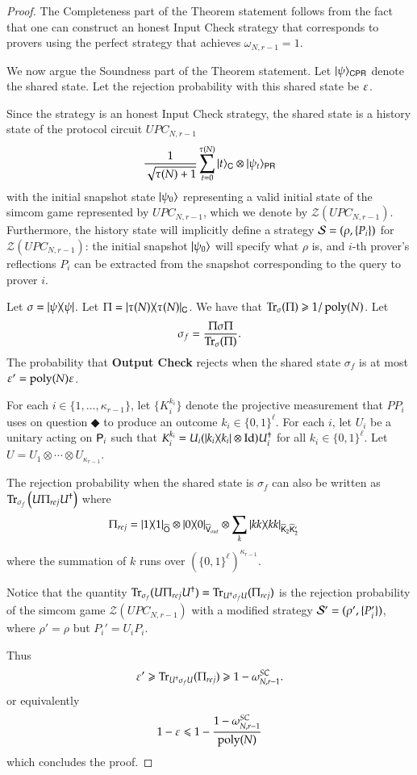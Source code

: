 \begin{proof}
The Completeness part of the Theorem statement follows from the fact that one can construct an honest Input Check strategy that corresponds to provers using the perfect strategy that achieves $\omega_{N,r-1} = 1$.

We now argue the Soundness part of the Theorem statement. Let $|\psi\rangle_{{\mathsf{C}} {\mathsf{P}} {\mathsf{R}}}$ denote the shared state. Let the rejection probability with this shared state be $\varepsilon$. 

Since the strategy is an honest Input Check strategy, the shared state is a history state of the protocol circuit $UPC_{N,r-1}$
\[
\frac{1}{\sqrt{\tau(N) + 1}} \sum_{t = 0}^{\tau(N)} |t\rangle_{{\mathsf{C}}} \otimes |\psi_t\rangle_{{\mathsf{P}} {\mathsf{R}}}
\]
with the initial snapshot state $|\psi_0\rangle$ representing a valid initial state of the simcom game represented by $UPC_{N,r-1}$, which we denote by $\mathscr{Z}(UPC_{N,r-1})$. Furthermore, the history state will implicitly define a strategy $\mathcal{S} = (\rho,\{P_i\})$ for $\mathscr{Z}(UPC_{N,r-1})$: the initial snapshot $|\psi_0\rangle$ will specify what $\rho$ is, and $i$-th prover's reflections $P_i$ can be extracted from the snapshot corresponding to the query to prover $i$.

Let $\sigma = |\psi\rangle\! \langle \psi|$. Let $\Pi = |\tau(N)\rangle\! \langle \tau(N)|_{{\mathsf{C}}}$. We have that $\operatorname{Tr}_\sigma (\Pi) \geqslant 1/\operatorname{poly}(N)$. Let
\[
\sigma_{f} = \frac{\Pi \sigma \Pi}{\operatorname{Tr}_\sigma (\Pi)}.
\]
The probability that \textbf{Output Check} rejects when the shared state $\sigma_f$ is at most $\varepsilon' = \operatorname{poly}(N) \varepsilon$. 

For each $i \in \{1,\ldots,\kappa_{r-1} \}$, let $\{ K_i^{k_i} \}$ denote the projective measurement that $PP_i$ uses on question $\Diamondblack$ to produce an outcome $k_i \in \{0,1\}^\ell$. For each $i$, let $U_i$ be a unitary acting on ${\mathsf{P}}_i$ such that $K_i^{k_i} = U_i (|k_i\rangle\! \langle k_i| \otimes \mathop{\mathrm{Id}}\!\mathinner{})U_i^\dagger$ for all $k_i \in \{0,1\}^\ell$. Let $U = U_1 \otimes \cdots \otimes U_{\kappa_{r-1}}$.

The rejection probability when the shared state is $\sigma_f$ can also be written as $\operatorname{Tr}_{\sigma_f} \left ( U\Pi_{rej}U^\dagger \right)$ where
\begin{align*}
	\Pi_{rej} &= |1\rangle\! \langle 1|_{\widehat{{\mathsf{O}}}} \otimes |0\rangle\! \langle 0|_{\widehat{{\mathsf{V}}}_{out}} \otimes \sum_k |kk\rangle\! \langle kk|_{\widehat{{\mathsf{K}}}_2 \widehat{{\mathsf{K}}}_2'}
\end{align*}
where the summation of $k$ runs over $(\{0,1\}^\ell)^{\kappa_{r-1}}$.

Notice that the quantity $\operatorname{Tr}_{\sigma_f}(U \Pi_{rej} U^\dagger) = \operatorname{Tr}_{U^\dagger \sigma_f U} (\Pi_{rej})$ is the rejection probability of the simcom game $\mathscr{Z}(UPC_{N,r-1})$ with a modified strategy $\mathcal{S}' = (\rho',\{P_i'\})$, where $\rho' = \rho$ but $P_i' = U_i P_i$. 

Thus 
\[
	\varepsilon' \geqslant \operatorname{Tr}_{U^\dagger \sigma_f U} (\Pi_{rej}) \geqslant 1 - \omega^{SC}_{N,r-1}.
\]
or equivalently
\[
	1 - \varepsilon \leqslant 1 - \frac{1 - \omega^{SC}_{N,r-1}}{\operatorname{poly}(N)}
\]
which concludes the proof.
\end{proof}



